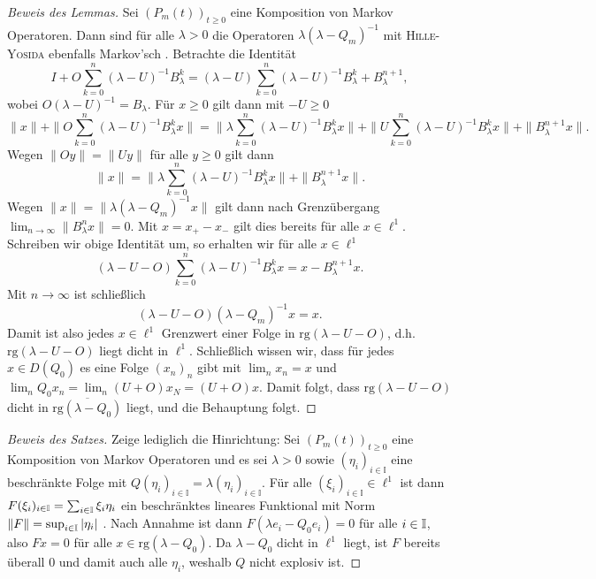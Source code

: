 \documentclass[a4paper]{paper}
\numberwithin{equation}{satz}
\begin{document}
\begin{proof}[Beweis des Lemmas]
  Sei $(P_m(t))_{t\geq0}$ eine Komposition von Markov Operatoren. Dann sind für alle $\lambda>0$ die Operatoren $\lambda (\lambda-Q_m)^{-1}$ mit \textsc{Hille-Yosida} ebenfalls Markov'sch . Betrachte die Identität
    $$I+O\sum_{k=0}^n(\lambda- U)^{-1}B_\lambda^k = (\lambda- U)\sum_{k=0}^n(\lambda-U)^{-1}B_\lambda^k + B_\lambda^{n+1},$$
  wobei $O(\lambda-U)^{-1}=B_\lambda$. Für  $x\geq0$ gilt dann mit $-U\geq0$ 
    $$\|x\|+\|O\sum_{k=0}^n(\lambda- U)^{-1}B_\lambda^kx\|=\|\lambda\sum_{k=0}^n(\lambda - U)^{-1}B_\lambda^kx\|+\|U\sum_{k=0}^n(\lambda-U)^{-1}B_\lambda^k x\|+\|B_\lambda^{n+1}x\|.$$ 
  Wegen $\|Oy\|=\|Uy\|$ für alle $y\geq0$ gilt dann 
    $$\|x\|=\|\lambda\sum_{k=0}^n (\lambda-U)^{-1}B_\lambda^k x\|+\|B_\lambda^{n+1}x\|.$$
  Wegen $\|x\|=\|\lambda(\lambda- Q_m)^{-1}x\|$  gilt dann nach Grenzübergang $\lim_{n\to\infty}\|B_\lambda^nx\|=0$. Mit $x=x_+-x_-$ gilt dies bereits für alle $x\in\ell^1$. Schreiben wir obige Identität um, so erhalten wir für alle $x\in\ell^1$ 
    $$(\lambda-U-O)\sum_{k=0}^n (\lambda-U)^{-1}B_\lambda^kx = x-B_\lambda^{n+1}x.$$
  Mit $n\to\infty$ ist schließlich 
    $$(\lambda-U-O)(\lambda-Q_m)^{-1}x=x.$$
  Damit ist also jedes $x\in\ell^1$ Grenzwert  einer Folge in $\text{rg}(\lambda-U-O)$, d.h. $\text{rg}(\lambda-U-O)$ liegt dicht in $\ell^1$. Schließlich wissen wir, dass für jedes $x\in D(Q_0)$ es eine Folge $(x_n)_n$ gibt mit $\lim_n x_n=x$ und $\lim_{n}Q_0x_n=\lim_{n}(U+O)x_N=(U+O)x$. Damit folgt, dass $\text{rg}(\lambda-U-O)$ dicht in $\overline{\text{rg}(\lambda-Q_0)}$ liegt, und die Behauptung folgt.
\end{proof}

\begin{proof}[Beweis des Satzes]
Zeige lediglich die Hinrichtung: Sei $(P_m(t))_{t\geq0}$ eine Komposition von Markov Operatoren und es sei  $\lambda >0$ sowie $(\eta_i)_{i\in\mathbb I}$ eine beschränkte Folge mit $Q(\eta_i)_{i\in\mathbb I}=\lambda(\eta_i)_{i\in\mathbb I}$. Für alle $(\xi_i)_{i\in\mathbb I}\in\ell^1$ ist dann $F(\xi_i)_{i\in\mathbb I} = \sum_{i\in\mathbb{I}}\xi_i\eta_i$ ein beschränktes lineares Funktional mit Norm $\|F\|=\sup_{i\in\mathbb{I}}|\eta_i|$ . Nach Annahme ist dann $F(\lambda e_i-Q_0e_i)=0$ für alle $i\in\mathbb{I}$, also $Fx=0$ für alle $x\in\text{rg}(\lambda-Q_0)$. Da $\lambda-Q_0$ dicht in $\ell^1$ liegt, ist $F$ bereits überall $0$ und damit auch alle $\eta_i$, weshalb $Q$ nicht explosiv ist.
\end{proof}
\end{document}
